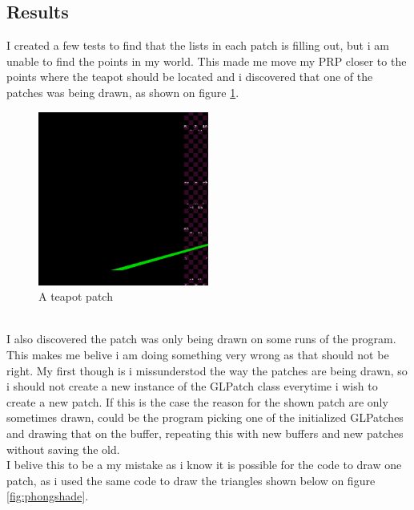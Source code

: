 \documentclass{article}
\begin{document}
\subsection{Results}
I created a few tests to find that the lists in each patch is filling out, but i am
unable to find the points in my world. This made me move my PRP closer to the points where
the teapot should be located and i discovered that one of the patches was being drawn, as
shown on figure \ref{fig:wat}.
\begin{figure}[h!]
\centering
    \includegraphics[width=0.5\textwidth, keepaspectratio]{wat.png}
    \caption{A teapot patch}
    \label{fig:wat}
\end{figure}\\
I also discovered the patch was only being drawn on some runs of the program. This makes
me belive i am doing something very wrong as that should not be right. My first though is
i missunderstod the way the patches are being drawn, so i should not create a new
instance of the GLPatch class everytime i wish to create a new patch. If this is the case
the reason for the shown patch are only sometimes drawn, could be the program picking one
of the initialized GLPatches and drawing that on the buffer, repeating this with new buffers
and new patches without saving the old.\\
I belive this to be a my mistake as i know it is possible for the code to draw one patch,
as i used the same code to draw the triangles shown below on figure \ref{fig:phongshade}.
\end{document}
